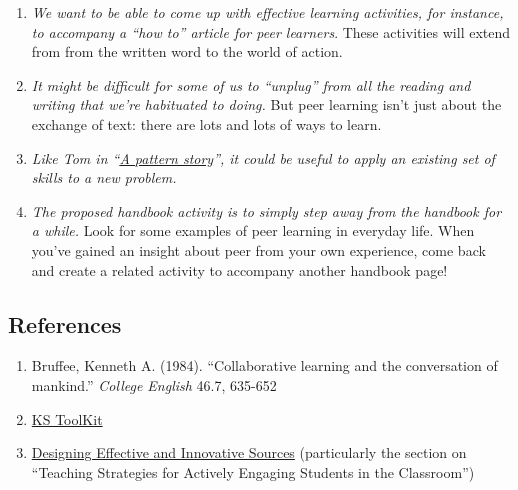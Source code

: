 \begin{enumerate}
\item
  \emph{We want to be able to come up with effective learning
  activities, for instance, to accompany a ``how to'' article for peer
  learners}. These activities will extend from from the written word to
  the world of action.
\item
  \emph{It might be difficult for some of us to ``unplug'' from all the
  reading and writing that we're habituated to doing.} But peer learning
  isn't just about the exchange of text: there are lots and lots of ways
  to learn.
\item
  \emph{Like Tom in ``\href{http://peeragogy.org/a-pattern-story/}{A
  pattern story}'', it could be useful to apply an existing set of
  skills to a new problem.}
\item
  \emph{The proposed handbook activity is to simply step away from the
  handbook for a while.} Look for some examples of peer learning in
  everyday life. When you've gained an insight about peer from your own
  experience, come back and create a related activity to accompany
  another handbook page!
\end{enumerate}
\subsection{References}

\begin{enumerate}
\item
  Bruffee, Kenneth A. (1984). ``Collaborative learning and the
  conversation of mankind.'' \emph{College English} 46.7, 635-652
\item
  \href{http://www.kstoolkit.org/KS+Methods}{KS ToolKit}
\item
  \href{http://serc.carleton.edu/NAGTWorkshops/coursedesign/tutorial/strategies.html}{Designing
  Effective and Innovative Sources} (particularly the section on
  ``Teaching Strategies for Actively Engaging Students in the
  Classroom'')
\end{enumerate}
